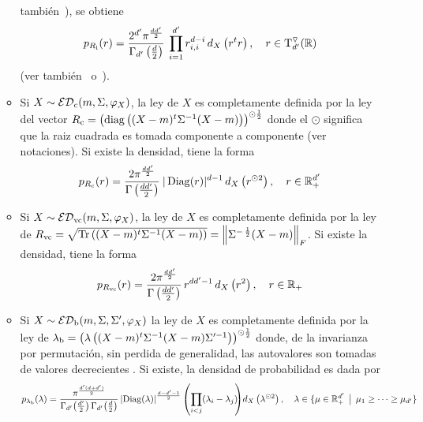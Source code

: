 \begin{itemize}
\begin{itemize}
    tambi\'en~\cite[p.~15-17]{GuNag99}), se obtiene
    \[
    p_{R_{\mathrm{i}}}(r)   =   \frac{2^{d'}   \pi^{\frac{d   d'}{2}}}{\Gamma_{d'}\left(
        \frac{d}{2} \right)} \:  \prod_{i=1}^{d'} r_{i,i}^{d-i} \, d_X\left( r^t
      r \right), \quad r \in \mathrm{T}^\triangledown_{d'}(\mathbb{R})
    \]
    (ver tambi\'en~\cite[Teo.~7.9.2]{And03} o~\cite{Dia13}).
  \item Si $X \sim \mathcal{ED}_{\mathrm{c}}(m,\Sigma,\varphi_X)$, la ley de $X$ es completamente
    definida  por  la  ley  del  vector $R_{\mathrm{c}}  =  \left(  \operatorname{diag}\left(  (X-m)^t
        \Sigma^{-1}  (X-m)  \right) \right)^{\odot  \frac12}$  donde el  $\odot$
    significa  que la  raiz  cuadrada  es tomada  componente  a componente  (ver
    notaciones). Si existe la densidad, tiene la forma
    \[
    p_{R_{\mathrm{c}}}(r)  = \frac{2  \pi^{\frac{d d'}{2}}}{\Gamma\left(  \frac{d d'}{2}
      \right)} \: |\operatorname{Diag}(r)|^{d-1} \, d_X\left( r^{\odot 2} \right), \quad r \in
    \mathbb{R}_+^{d'}
    \]
  \item   Si  $X  \sim   \mathcal{ED}_{\mathrm{vc}}(m,\Sigma,\varphi_X)$,  la   ley  de   $X$  es
    completamente  definida por  la ley  de $R_{\mathrm{vc}}  =  \sqrt{\operatorname{Tr}\left( (X-m)^t
        \Sigma^{-1}  (X-m)  \right)}  =  \left\|  \Sigma^{-  \,  \frac12}  (X-m)
    \right\|_F$. Si existe la densidad, tiene la forma
    \[
    p_{R_{\mathrm{vc}}}(r) =  \frac{2 \pi^{\frac{d d'}{2}}}{\Gamma\left(  \frac{d d'}{2}
      \right)} \, r^{d d'-1} \, d_X\left( r^2 \right), \quad r \in \mathbb{R}_+
    \]
  \item  Si  $X \sim  \mathcal{ED}_{\mathrm{b}}(m,\Sigma,\Sigma',\varphi_X)$  la  ley  de $X$  es
    completamente definida  por la ley  de $\lambda_{\mathrm{b}} =  \left( \lambda\left(
        (X-m)^t \Sigma^{-1} (X-m)  \Sigma'^{-1} \right) \right)^{\odot \frac12}$
    donde, de la  invarianza por permutaci\'on, sin perdida  de generalidad, las
    autovalores son tomadas de valores decrecientes .  Si existe, la densidad de
    probabilidad es dada por
    \[
    p_{\lambda_{\mathrm{b}}}(\lambda)      =      \frac{\pi^{\frac{d'      (d+d')}{2}}}{
      \Gamma_{d'}\!\left(   \frac{d'}{2}  \right)   \Gamma_{d'}\!\left(  \frac{d}{2}
      \right)}   \left|  \operatorname{Diag}(\lambda)   \right|^{\frac{d-d'-1}{2}}  \left(
       \prod_{i  < j} (\lambda_i-\lambda_j)  \!\! \right) \! d_X\left(  \lambda^{\odot 2}
    \right), \quad \lambda \in \{ \mu  \in \mathbb{R}_+^{d'} \:\: \big| \:\: \mu_1 \ge \cdots \ge
    \mu_{d'} \}
    \]

\end{itemize}
\end{itemize}
